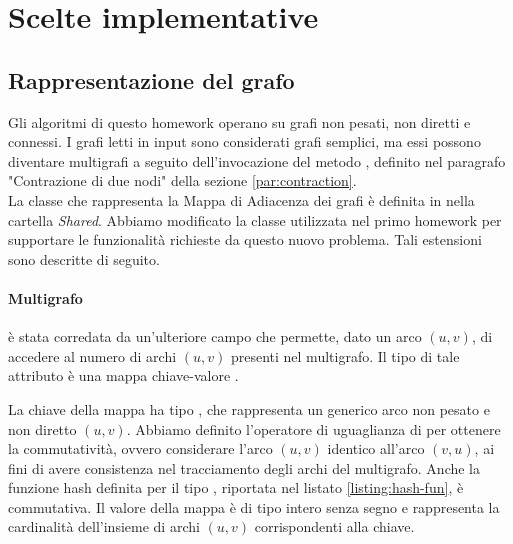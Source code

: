 \section{Scelte implementative}
\label{cap:implementation-choices}

\subsection{Rappresentazione del grafo}
\label{sub:graph-representation}

Gli algoritmi di questo homework operano su grafi non pesati,
 non diretti e connessi. I grafi letti in input sono considerati grafi semplici, ma essi possono diventare multigrafi a seguito dell'invocazione del metodo , definito nel paragrafo "Contrazione di due nodi" della sezione \ref{par:contraction}. \\


\noindent La classe che rappresenta la Mappa di Adiacenza dei grafi è
definita in  nella cartella
\textit{Shared}. Abbiamo modificato la classe utilizzata nel primo homework per supportare le funzionalità richieste da questo nuovo problema. Tali estensioni sono descritte di seguito.

\paragraph{Multigrafo}
 è stata corredata da un'ulteriore
campo  che permette, dato un arco $(u,v)$, di
accedere al numero di archi $(u,v)$ presenti nel multigrafo. Il tipo di tale attributo è una mappa chiave-valore .

\noindent La chiave della mappa ha tipo , che rappresenta un generico arco non pesato e non diretto $(u,v)$. Abbiamo definito l'operatore di uguaglianza di  per ottenere la commutatività, ovvero considerare l'arco $(u, v)$ identico all'arco $(v, u)$, ai fini di avere consistenza nel tracciamento degli archi del multigrafo. Anche la funzione hash definita per il tipo , riportata nel listato  \ref{listing:hash-fun}, è commutativa.
\noindent Il valore della mappa è di tipo intero senza segno  e rappresenta la cardinalità dell'insieme di archi $(u,v)$ corrispondenti alla chiave. \\

